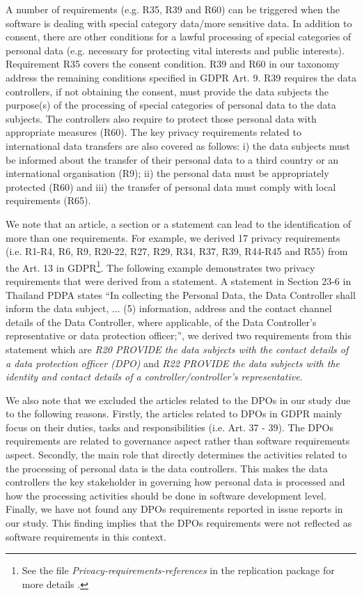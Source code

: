 \documentclass{article}
\begin{document}
A number of requirements (e.g. R35, R39 and R60) can be triggered when the software is dealing with special category data/more sensitive data. In addition to consent, there are other conditions for a lawful processing of special categories of personal data (e.g. necessary for protecting vital interests and public interests). Requirement R35 covers the consent condition. R39 and R60 in our taxonomy address the remaining conditions specified in GDPR Art. 9. R39 requires the data controllers, if not obtaining the consent, must provide the data subjects the purpose(s) of the processing of special categories of personal data to the data subjects. The controllers also require to protect those personal data with appropriate measures (R60). The key privacy requirements related to international data transfers are also covered as follows: i) the data subjects must be informed about the transfer of their personal data to a third country or an international organisation (R9); ii) the personal data must be appropriately protected (R60) and iii) the transfer of personal data must comply with local requirements (R65).

We note that an article, a section or a statement can lead to the identification of more than one requirements. For example, we derived 17 privacy requirements (i.e. R1-R4, R6, R9, R20-22, R27, R29, R34, R37, R39, R44-R45 and R55) from the Art. 13 in GDPR\footnote{See the file \emph{Privacy-requirements-references} in the replication package for more details \cite{reppkg-pridp}.}. The following example demonstrates two privacy requirements that were derived from a statement. A statement in Section 23-6 in Thailand PDPA states ``In collecting the Personal Data, the Data Controller shall inform the data subject, ... (5) information, address and the contact channel details of the Data Controller, where applicable, of the Data Controller's representative or data protection officer;'', we derived two requirements from this statement which are \textit{R20 PROVIDE the data subjects with the contact details of a data protection officer (DPO)} and \textit{R22 PROVIDE the data subjects with the identity and contact details of a controller/controller's representative}.

We also note that we excluded the articles related to the DPOs in our study due to the following reasons. Firstly, the articles related to DPOs in GDPR mainly focus on their duties, tasks and responsibilities (i.e. Art. 37 - 39). The DPOs requirements are related to governance aspect rather than software requirements aspect. Secondly, the main role that directly determines the activities related to the processing of personal data is the data controllers. This makes the data controllers the key stakeholder in governing how personal data is processed and how the processing activities should be done in software development level. Finally, we have not found any DPOs requirements reported in issue reports in our study. This finding implies that the DPOs requirements were not reflected as software requirements in this context.
\end{document}
